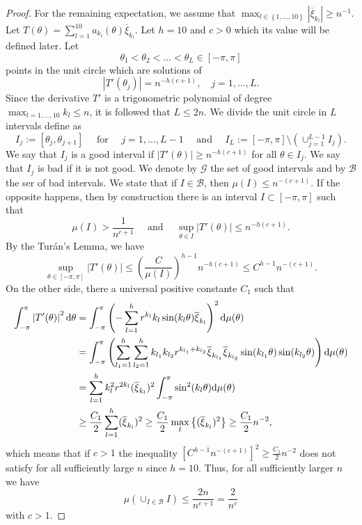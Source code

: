 \documentclass[12pt]{amsart}
\theoremstyle{plain}
\numberwithin{equation}{section}
\newcommand{\<}{\langle}
\renewcommand{\>}{\rangle}
\newcommand{\PP}[1]{\left(#1\right)}
\newcommand{\CC}[1]{\left[#1\right]}
\newcommand{\LL}[1]{\left\{#1\right\}}
\newcommand{\dd}{\textnormal{d}}
\newcommand{\abs}[1]{\left|#1\right|}
\renewcommand{\line}{\overline}
\begin{document}
\begin{proof}
For the remaining expectation, we assume that $\max_{l\in\LL{1,\ldots,10}} \abs{\overline{\xi}_{k_l}} \geq n^{-1}$. Let $T(\theta) = \sum_{l=1}^{10} a_{k_l}(\theta) \line{\xi}_{k_l}$. Let $h=10$ and $c>0$ which its value will be defined later. Let \[\theta_1 < \theta_2<\ldots <\theta_L\in [-\pi,\pi]\] points in the unit circle which are solutions of \[ \abs{T'(\theta_j)} = n^{-h(c+1)},\quad j=1,\ldots,L.\]
Since the derivative $T'$ is a trigonometric polynomial of degree $\max_{l=1,\ldots,10} k_l \leq n$, it is followed that $L\leq 2n$. We divide the unit circle in $L$ intervals define as
\[
I_j := [\theta_j, \theta_{j+1}]\quad \mbox{ for }\quad j=1,\ldots, L-1 \quad \mbox{ and }\quad I_L := [-\pi,\pi] \setminus\PP{\cup_{j=1}^{L-1} I_j}.
\]
We say that $I_j$ is a good interval if $\abs{T'(\theta)} \geq n^{-h(c+1)}$ for all $\theta\in I_j$. We say that $I_j$ is bad if it is not good. We denote by $\mathcal{G}$ the set of good intervals and by $\mathcal{B}$ the ser of bad intervals. We state that if $I\in \mathcal{B}$, then $\mu(I) \leq n^{-(c+1)}$. If the opposite happens, then by construction there is an interval $I\subset [-\pi,\pi]$ such that
\[
\mu(I) > \frac{1}{n^{c+1}} \quad \mbox{ and } \quad \sup_{\theta\in I} \abs{T'(\theta)} \leq n^{- h(c+1)}.
\]
By the Turán's Lemma, we have
\[
\sup_{\theta\in[-\pi,\pi]} \abs{T'(\theta)} \leq \PP{\frac{C}{\mu(I)}}^{h-1} n^{-h(c+1)} \leq C^{h-1} n^{-(c+1)}.
\]
On the other side, there a universal positive constante $C_1$ such that
\begin{align*}
\int_{-\pi}^{\pi} \abs{T'(\theta)}^2 \dd \theta& = \int_{-\pi}^{\pi} \PP{ -\sum_{l=1}^{h} r^{k_l} k_l \sin(k_l\theta) \overline{\xi}_{k_l} }^2 \dd \mu(\theta) \\
& = \int_{-\pi}^{\pi} \PP{ \sum_{l_1=1}^{h}\sum_{l_2=1}^{h} k_{l_1}k_{l_2} r^{k_{l_1}+k_{l_2}} \overline{\xi}_{k_{l_1}}\overline{\xi}_{k_{l_2}} \sin(k_{l_1}\theta)\sin(k_{l_2}\theta) } \dd \mu(\theta) \\
& = \sum_{l=1}^{h} k_{l}^2 r^{2k_{l}} (\overline{\xi}_{k_{l}})^2 \int_{-\pi}^{\pi} \sin^2(k_{l}\theta) \dd \mu(\theta) \\
& \geq \frac{C_1}{2} \sum_{l=1}^{h} (\overline{\xi}_{k_{l}})^2 \geq \frac{C_1}{2} \max_{l}\LL{(\overline{\xi}_{k_{l}})^2} \geq \frac{C_1}{2} n^{-2},
\end{align*}
which means that if $c>1$ the inequality $\CC{C^{h-1}n^{-(c+1)}}^2 \geq \frac{C_1}{2}n^{-2}$ does not satisfy for all sufficiently large $n$ since $h=10$. Thus, for all sufficiently larger $n$ we have
\[
\mu\PP{\cup_{I\in\mathcal{B}} I} \leq \frac{2n}{n^{c+1}} = \frac{2}{n^{c}}
\]
with $c>1$.


\end{proof}
\end{document}
